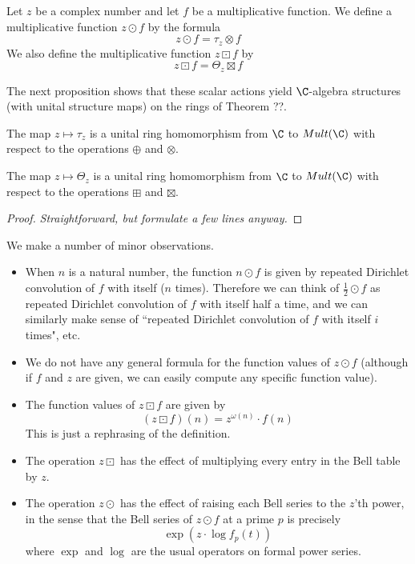 \documentclass[a4paper]{article}
\begin{document}
\begin{definition}
Let $z$ be a complex number and let $f$ be a multiplicative function. We define a multiplicative function $z \odot f$ by the formula
$$  z \odot f = \tau_z \otimes f $$
We also define the multiplicative function $z \boxdot f$ by
$$ z \boxdot f = \Theta_z \boxtimes f  $$
\end{definition}
The next proposition shows that these scalar actions yield $\C$-algebra structures (with unital structure maps) on the rings of Theorem ??. 
\begin{proposition}
The map $z \mapsto \tau_z$ is a unital ring homomorphism from $\C$ to $Mult(\C)$ with respect to the operations $\oplus$ and $\otimes$.

The map $z \mapsto \Theta_z$ is a unital ring homomorphism from $\C$ to $Mult(\C)$ with respect to the operations $\boxplus$ and $\boxtimes$.
\end{proposition}
\begin{proof}
\emph{Straightforward, but formulate a few lines anyway.}
\end{proof}

\begin{remark}
We make a number of minor observations.
\begin{itemize}
\item When $n$ is a natural number, the function $n \odot f$ is given by repeated Dirichlet convolution of $f$ with itself ($n$ times). Therefore we can think of $\frac{1}{2} \odot f$ as repeated Dirichlet convolution of $f$ with itself half a time, and we can similarly make sense of ``repeated Dirichlet convolution of $f$ with itself $i$ times", etc. 
\item We do not have any general formula for the function values of $z \odot f$ (although if $f$ and $z$ are given, we can easily compute any specific function value). 
\item The function values of $z \boxdot f$ are given by
$$   (z \boxdot f)(n)  = z^{\omega(n)} \cdot f(n) $$ 
This is just a rephrasing of the definition.    
\item The operation $z \boxdot $ has the effect of multiplying every entry in the Bell table by $z$.
\item The operation $z \odot$ has the effect of raising each Bell series to the $z$'th power, in the sense that the Bell series of $z \odot f$ at a prime $p$ is precisely
$$    \exp (z \cdot \log f_p(t))   $$
where $\exp$ and $\log$ are the usual operators on formal power series.
\end{itemize}

\end{remark}
\end{document}

